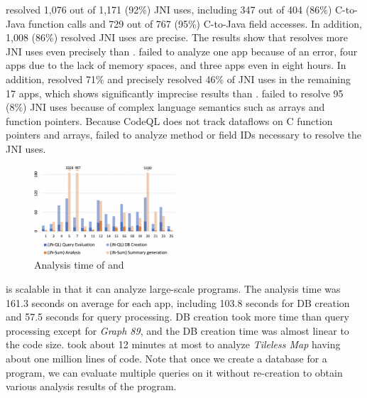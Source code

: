 \ours resolved 1,076 out of 1,171 (92\%) JNI uses, including 347 out of 404
(86\%) C-to-Java function calls and 729 out of 767 (95\%) C-to-Java field
accesses. In addition, 1,008 (86\%) resolved JNI uses are precise.
The results show that \ours resolves more JNI uses
even precisely than \lees. \lees failed to analyze one app
because of an error, four apps due to the lack of memory spaces,
and three apps even in eight hours.  In addition, \lees resolved
71\% and precisely resolved 46\% of JNI uses in the remaining 17
apps, which shows significantly imprecise results than \ours.
%
\ours failed to resolve 95 (8\%) JNI uses because of complex
language semantics such as arrays and function pointers.  Because CodeQL does
not track dataflows on C function pointers and arrays, \ours failed to analyze
method or field IDs necessary to resolve the JNI uses.


\begin{figure}[t]
  \centering
  \vspace{2mm}
  \includegraphics[width=0.47\textwidth]{img/graph}
  \vspace*{-.5em}
  \caption{Analysis time of \ours and \lees}
  \label{fig:graph}
\vspace*{-1em}
\end{figure}

\ours is scalable in that it can analyze large-scale programs. The analysis
time was 161.3 seconds on average for each app, including 103.8 seconds for DB
creation and 57.5 seconds for query processing.  DB creation took more time
than query processing except for {\it Graph 89}, and the DB creation time was
almost linear to the code size. \ours took about 12 minutes at most to analyze
{\it Tileless Map} having about one million lines of code.
Note that once we create a database
for a program, we can evaluate multiple queries on it without
re-creation to obtain various analysis results of the program.


